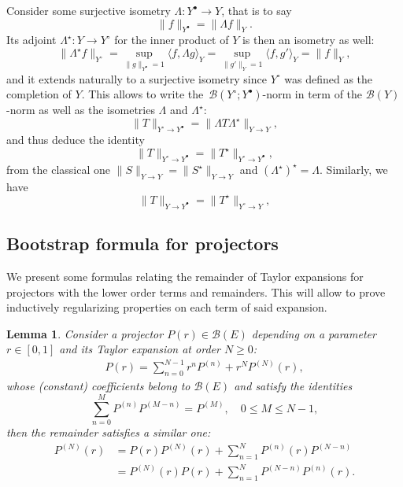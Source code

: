 \documentclass[10pt]{amsart}
\newtheorem{lemm}[theo]{Lemma}\newtheorem{prop}[theo]{Proposition}\newtheorem{coro}[theo]{Corollary}\newtheorem{conj}[theo]{Conjecture}
\theoremstyle{definition}\newtheorem{defi}[theo]{Definition}\newtheorem{rema}[theo]{Remark}\newtheorem{exam}[theo]{Example}\newtheorem{exem}[theo]{Example}\newtheorem{nota}[theo]{Notation}
\newcommand{\BBB}{\mathscr{B}}
\newcommand{\Sg}{Y}
\newcommand{\Sgp}{Y^{\bullet}}
\newcommand{\Sgm}{Y^{\circ}}
\renewcommand*\le{\leqslant}
\renewcommand*\ge{\geqslant}
\newcommand{\la}{\langle}
\newcommand{\ra}{\rangle}
\begin{document}
Consider some surjective isometry $\Lambda : \Sgp \to \Sg$, that is to say
\[
\| f \|_{\Sgp} = \| \Lambda f \|_{\Sg}.
\]
Its adjoint $\Lambda^\star : \Sg \to \Sgm$ for the inner product of $\Sg$ is then an isometry as well:
\begin{equation*}
\| \Lambda^\star f \|_{\Sgm} = \sup_{\| g \|_{\Sgp} = 1} \la f, \Lambda g \ra_{\Sg} = \sup_{\| g' \|_{\Sg} = 1} \la f, g' \ra_{\Sg} = \| f \|_{\Sg},
\end{equation*}
and it extends naturally to a surjective isometry since $\Sgm$ was defined as the completion of $\Sg$. This allows to write the~$\BBB(\Sgm ; \Sgp)$-norm in term of the $\BBB(\Sg)$-norm as well as the isometries $\Lambda$ and $\Lambda^\star$:
\[
\| T \|_{ \Sgm \to \Sgp } = \| \Lambda T \Lambda^\star \|_{ \Sg \to \Sg},
\]
and thus deduce the identity
\begin{equation}\label{eq:twisted_adjoint_identity}
\| T \|_{ \Sgm \to \Sgp } = \| T^\star \|_{ \Sgm \to \Sgp },
\end{equation}
from the classical one $\| S \|_{\Sg \to \Sg} = \| S^\star \|_{\Sg \to \Sg}$ and $(\Lambda^\star)^\star=\Lambda$. Similarly, we have
\begin{equation}\label{eq:twisted_adjoint_identity_one_sided}
\| T \|_{\Sg \to \Sgp } = \| T^\star \|_{ \Sgm \to \Sg },
\end{equation}


\subsection{Bootstrap formula for projectors}\label{scn:boostrap_projectors}

We present some formulas relating the remainder of Taylor expansions for projectors with the lower order terms and remainders. This will allow to prove inductively regularizing properties on each term of said expansion.

\begin{lemm}
Consider a projector $P(r) \in \BBB(E)$ depending on a parameter $r \in [0, 1]$ and its Taylor expansion at order $N \ge 0$:
\begin{gather*}
P(r) = \sum_{n=0}^{N-1} r^n P^{(n)} + r^N P^{(N)}(r),
\end{gather*}
whose (constant) coefficients belong to $\BBB(E)$ and satisfy the identities
\begin{equation}\label{eq:convolution_polynom_projector}
\sum_{n=0}^{M} P^{(n)} P^{(M-n)} =P^{(M)}, \quad 0 \le M \le N-1,
\end{equation}
then the remainder satisfies a similar one:
\begin{align}
P^{(N)}(r) & = P(r) P^{(N)}(r) + \sum_{n=1}^{N} P^{(n)} (r) P^{(N-n)}\label{eq:bootstrap_P_N_A} \\
& = P^{(N)}(r) P(r) + \sum_{n=1}^{N} P^{(N-n)} P^{(n)} (r).
\label{eq:bootstrap_P_N_B}
\end{align}
\end{lemm}
\end{document}
